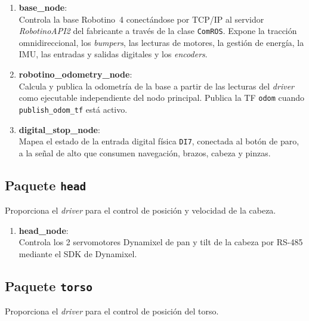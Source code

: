 \begin{enumerate}

\item \textbf{base\_node}: \\
Controla la base Robotino~4 conectándose por TCP/IP al servidor \textit{RobotinoAPI2} del fabricante a través de la clase \texttt{ComROS}. Expone la tracción omnidireccional, los \textit{bumpers}, las lecturas de motores, la gestión de energía, la IMU, las entradas y salidas digitales y los \textit{encoders}.

\item \textbf{robotino\_odometry\_node}: \\
Calcula y publica la odometría de la base a partir de las lecturas del \textit{driver} como ejecutable independiente del nodo principal. Publica la TF \texttt{odom} cuando \texttt{publish\_odom\_tf} está activo.

\item \textbf{digital\_stop\_node}: \\
Mapea el estado de la entrada digital física \texttt{DI7}, conectada al botón de paro, a la señal de alto que consumen navegación, brazos, cabeza y pinzas.

\end{enumerate}

\subsection{Paquete \texttt{head}}

Proporciona el \textit{driver} para el control de posición y velocidad de la cabeza.

\begin{enumerate}

\item \textbf{head\_node}: \\
Controla los 2 servomotores Dynamixel de pan y tilt de la cabeza por RS-485 mediante el SDK de Dynamixel.

\end{enumerate}

\subsection{Paquete \texttt{torso}}

Proporciona el \textit{driver} para el control de posición del torso.

